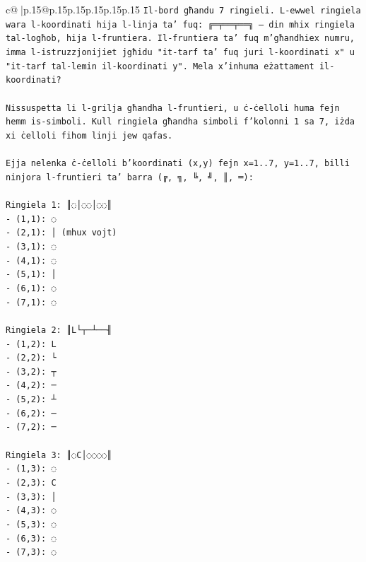 \documentclass{article}
\begin{document}
{\begin{supertabular}{c@{$\;$}|p{.15\linewidth}@{}p{.15\linewidth}p{.15\linewidth}p{.15\linewidth}p{.15\linewidth}p{.15\linewidth}}
{{{\texttt{Il{-}bord għandu 7 ringieli. L{-}ewwel ringiela wara l{-}koordinati hija l{-}linja ta' fuq: ╔═╤══╤══╗ — din mhix ringiela tal{-}logħob, hija l{-}fruntiera. Il{-}fruntiera ta' fuq m'għandhiex numru, imma l{-}istruzzjonijiet jgħidu "it{-}tarf ta' fuq juri l{-}koordinati x" u "it{-}tarf tal{-}lemin il{-}koordinati y". Mela x'inhuma eżattament il{-}koordinati?} \\
\\ 
\texttt{Nissuspetta li l{-}grilja għandha l{-}fruntieri, u ċ{-}ċelloli huma fejn hemm is{-}simboli. Kull ringiela għandha simboli f'kolonni 1 sa 7, iżda xi ċelloli fihom linji jew qafas.} \\
\\ 
\texttt{Ejja nelenka ċ{-}ċelloli b'koordinati (x,y) fejn x=1..7, y=1..7, billi ninjora l{-}fruntieri ta' barra (╔, ╗, ╚, ╝, ║, ═):} \\
\\ 
\texttt{Ringiela 1: ║◌│◌◌│◌◌║} \\
\texttt{{-} (1,1): ◌} \\
\texttt{{-} (2,1): │ (mhux vojt)} \\
\texttt{{-} (3,1): ◌} \\
\texttt{{-} (4,1): ◌} \\
\texttt{{-} (5,1): │} \\
\texttt{{-} (6,1): ◌} \\
\texttt{{-} (7,1): ◌} \\
\\ 
\texttt{Ringiela 2: ║L└┬─┴──╢} \\
\texttt{{-} (1,2): L} \\
\texttt{{-} (2,2): └} \\
\texttt{{-} (3,2): ┬} \\
\texttt{{-} (4,2): ─} \\
\texttt{{-} (5,2): ┴} \\
\texttt{{-} (6,2): ─} \\
\texttt{{-} (7,2): ─} \\
\\ 
\texttt{Ringiela 3: ║◌C│◌◌◌◌║} \\
\texttt{{-} (1,3): ◌} \\
\texttt{{-} (2,3): C} \\
\texttt{{-} (3,3): │} \\
\texttt{{-} (4,3): ◌} \\
\texttt{{-} (5,3): ◌} \\
\texttt{{-} (6,3): ◌} \\
\texttt{{-} (7,3): ◌} \\
}}}
\end{supertabular}}
\end{document}
